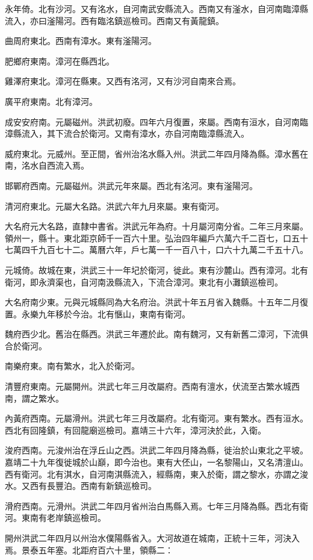 永年倚。北有沙河。又有洺水，自河南武安縣流入。西南又有滏水，自河南臨漳縣流入，亦曰滏陽河。西有臨洺鎮巡檢司。西南又有黃龍鎮。

曲周府東北。西南有漳水。東有滏陽河。

肥鄉府東南。漳河在縣西北。

雞澤府東北。漳河在縣東。又西有洺河，又有沙河自南來合焉。

廣平府東南。北有漳河。

成安安府南。元屬磁州。洪武初廢。四年六月復置，來屬。西南有洹水，自河南臨漳縣流入，其下流合於衛河。又南有漳水，亦自河南臨漳縣流入。

威府東北。元威州。至正間，省州治洺水縣入州。洪武二年四月降為縣。漳水舊在南，洺水自西流入焉。

邯鄲府西南。元屬磁州。洪武元年來屬。西北有洺河。東有滏陽河。

清河府東北。元屬大名路。洪武六年九月來屬。東有衛河。

大名府元大名路，直隸中書省。洪武元年為府。十月屬河南分省。二年三月來屬。領州一，縣十。東北距京師千一百六十里。弘治四年編戶六萬六千二百七，口五十七萬四千九百七十二。萬曆六年，戶七萬一千一百八十，口六十九萬二千五十八。

元城倚。故城在東，洪武三十一年圮於衛河，徙此。東有沙麓山。西有漳河。北有衛河，即永濟渠也，自河南汲縣流入，下流合漳河。東北有小灘鎮巡檢司。

大名府南少東。元與元城縣同為大名府治。洪武十年五月省入魏縣。十五年二月復置。永樂九年移於今治。北有愜山，東南有衛河。

魏府西少北。舊治在縣西。洪武三年遷於此。南有魏河，又有新舊二漳河，下流俱合於衛河。

南樂府東。南有繁水，北入於衛河。

清豐府東南。元屬開州。洪武七年三月改屬府。西南有澶水，伏流至古繁水城西南，謂之繁水。

內黃府西南。元屬滑州。洪武七年三月改屬府。北有衛河。東有繁水。西有洹水。西北有回隆鎮，有回龍廟巡檢司。嘉靖三十六年，漳河決於此，入衛。

浚府西南。元浚州治在浮丘山之西。洪武二年四月降為縣，徙治於山東北之平坡。嘉靖二十九年復徙城於山巔，即今治也。東有大伾山，一名黎陽山，又名清澶山。西有衛河。北有淇水，自河南淇縣流入，經縣南，東入於衛，謂之黎水，亦謂之浚水。又西有長豐泊。西南有新鎮巡檢司。

滑府西南。元滑州。洪武二年四月省州治白馬縣入焉。七年三月降為縣。西北有衛河。東南有老岸鎮巡檢司。

開州洪武二年四月以州治水僕陽縣省入。大河故道在城南，正統十三年，河決入焉。景泰五年塞。北距府百六十里，領縣二：

